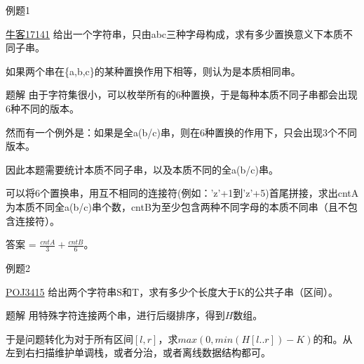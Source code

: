 \documentclass[usenames,dvipsnames]{ctexbeamer}		%
\begin{document}
\begin{frame}{例题1}
    
\begin{block}{\href{https://ac.nowcoder.com/acm/problem/17141}{牛客17141}}
给出一个字符串，只由abc三种字母构成，求有多少置换意义下本质不同子串。

如果两个串在\{a,b,c\}的某种置换作用下相等，则认为是本质相同串。
\end{block}

\pause

\begin{block}{题解}
由于字符集很小，可以枚举所有的6种置换，于是每种本质不同子串都会出现6种不同的版本。

\pause

然而有一个例外是：如果是全a(b/c)串，则在6种置换的作用下，只会出现3个不同版本。

因此本题需要统计本质不同子串，以及本质不同的全a(b/c)串。

\pause

可以将6个置换串，用互不相同的连接符(例如：'z'+1到'z'+5)首尾拼接，求出cntA为本质不同全a(b/c)串个数，cntB为至少包含两种不同字母的本质不同串（且不包含连接符）。

答案 = $\frac{cntA}{3} + \frac{cntB}{6}$。

\end{block}
\end{frame}

\begin{frame}{例题2}

\begin{block}{\href{http://poj.org/problem?id=3415}{POJ3415}}
给出两个字符串S和T，求有多少个长度大于K的公共子串（区间）。
\end{block}
    
\pause

\begin{block}{题解}
用特殊字符连接两个串，进行后缀排序，得到$H$数组。

于是问题转化为对于所有区间$[l,r]$，求$max(0, min(H[l..r]) - K)$的和。从左到右扫描维护单调栈，或者分治，或者离线数据结构都可。
\end{block}
\end{frame}
\end{document}
